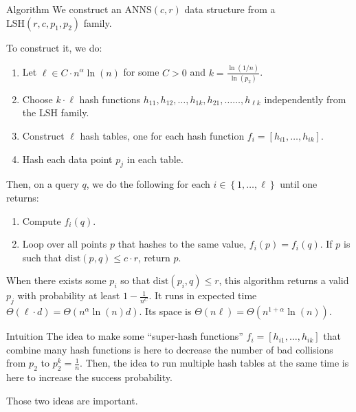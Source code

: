 \documentclass[a4paper]{article}
\begin{document}
\begin{parag}{Algorithm}
    We construct an $\text{ANNS}\left(c, r\right)$ data structure from a $\text{LSH}\left(r, c, p_1, p_2\right)$ family.

    To construct it, we do:
    \begin{enumerate}
        \item Let $\ell \in C\cdot n^{\alpha} \ln\left(n\right)$ for some $C > 0$ and $k = \frac{\ln\left(1/n\right)}{\ln\left(p_2\right)}$.
        \item Choose $k\cdot \ell$ hash functions $h_{11}, h_{12}, \ldots, h_{1k}, h_{21}, \ldots \ldots, h_{\ell k}$ independently from the LSH family. 
        \item Construct $\ell$ hash tables, one for each hash function $f_i = \left[h_{i1}, \ldots, h_{ik}\right]$.
        \item Hash each data point $p_j$ in each table.
    \end{enumerate}

    Then, on a query $q$, we do the following for each $i \in \left\{1, \ldots, \ell\right\}$ until one returns:
    \begin{enumerate}
        \item Compute $f_i\left(q\right)$.
        \item Loop over all points $p$ that hashes to the same value, $f_i\left(p\right) = f_i\left(q\right)$. If $p$ is such that $\text{dist}\left(p, q\right) \leq c\cdot r$, return $p$.
    \end{enumerate}

    When there exists some $p_i$ so that $\text{dist}\left(p_i, q\right) \leq r$, this algorithm returns a valid $p_j$ with probability at least $1 - \frac{1}{n^C}$. It runs in expected time $\Theta\left(\ell\cdot d\right) = \Theta\left(n^{\alpha} \ln\left(n\right) d\right)$. Its space is $\Theta\left(n \ell\right) = \Theta\left(n^{1 + \alpha} \ln\left(n\right)\right)$. 

    \begin{subparag}{Intuition}
        The idea to make some ``super-hash functions'' $f_i = \left[h_{i1}, \ldots, h_{ik}\right]$ that combine many hash functions is here to decrease the number of bad collisions from $p_2$ to $p_2^k = \frac{1}{n}$. Then, the idea to run multiple hash tables at the same time is here to increase the success probability.

        Those two ideas are important.
    \end{subparag}


\end{parag}
\end{document}
